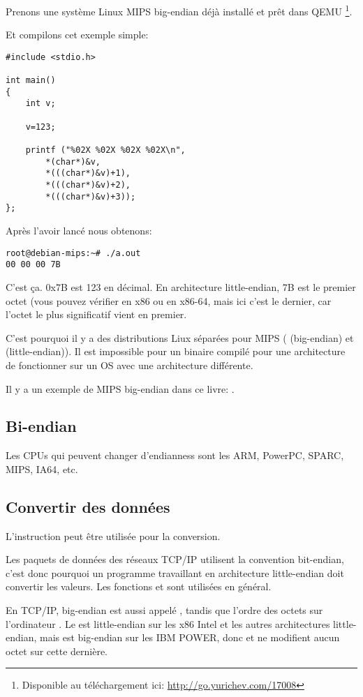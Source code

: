 Prenons une système Linux MIPS big-endian déjà installé et prêt dans QEMU
\footnote{Disponible au téléchargement ici: \url{http://go.yurichev.com/17008}}.


Et compilons cet exemple simple:

\begin{lstlisting}[style=customc]
#include <stdio.h>

int main()
{
	int v;

	v=123;

	printf ("%02X %02X %02X %02X\n", 
		*(char*)&v,
		*(((char*)&v)+1),
		*(((char*)&v)+2),
		*(((char*)&v)+3));
};
\end{lstlisting}

Après l'avoir lancé nous obtenons:

\begin{lstlisting}
root@debian-mips:~# ./a.out 
00 00 00 7B
\end{lstlisting}

C'est ça.
0x7B est 123 en décimal.
En architecture little-endian, 7B est le premier octet (vous pouvez vérifier en x86
ou en x86-64, mais ici c'est le dernier, car l'octet le plus significatif vient en
premier.

C'est pourquoi il y a des distributions Liux séparées pour MIPS ( (big-endian)
et  (little-endian)).
Il est impossible pour un binaire compilé pour une architecture de fonctionner sur
un \ac{OS} avec une architecture différente.

Il y a un exemple de MIPS big-endian dans ce livre: .

\subsection{Bi-endian}

Les CPUs qui peuvent changer d'endianness sont les ARM, PowerPC, SPARC, MIPS, \ac{IA64}, etc.

\subsection{Convertir des données}

L'instruction  peut être utilisée pour la conversion.

Les paquets de données des réseaux TCP/IP utilisent la convention bit-endian, c'est
donc pourquoi un programme travaillant en architecture little-endian doit convertir
les valeurs.
Les fonctions  et  sont utilisées en général.

En TCP/IP, big-endian est aussi appelé , tandis que l'ordre
des octets sur l'ordinateur .
Le  est little-endian sur les x86 Intel et les autres architectures
little-endian, mais est big-endian sur les IBM POWER, donc  et 
ne modifient aucun octet sur cette dernière.

